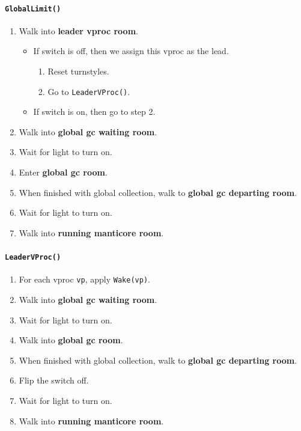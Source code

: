 \documentclass[11pt]{article}
\begin{document}
\paragraph{\texttt{GlobalLimit()}}

\begin{enumerate}
  \item Walk into \textbf{leader vproc room}.
    \begin{itemize}
      \item If switch is off, then we assign this vproc as the lead.
        \begin{enumerate}
          \item Reset turnstyles.
          \item Go to \texttt{LeaderVProc()}.
        \end{enumerate}
      \item If switch is on, then go to step 2.
    \end{itemize}
  \item Walk into \textbf{global gc waiting room}.
  \item Wait for light to turn on.
  \item Enter \textbf{global gc room}.
  \item When finished with global collection, walk to \textbf{global gc departing room}.
  \item Wait for light to turn on.
  \item Walk into \textbf{running manticore room}.
\end{enumerate}

\paragraph{\texttt{LeaderVProc()}}

\begin{enumerate}
  \item For each vproc \texttt{vp}, apply \texttt{Wake(vp)}.
  \item Walk into \textbf{global gc waiting room}.
  \item Wait for light to turn on.
  \item Walk into \textbf{global gc room}.
  \item When finished with global collection, walk to \textbf{global gc departing room}.
  \item Flip the switch off.
  \item Wait for light to turn on.
  \item Walk into \textbf{running manticore room}.
\end{enumerate}
\end{document}
